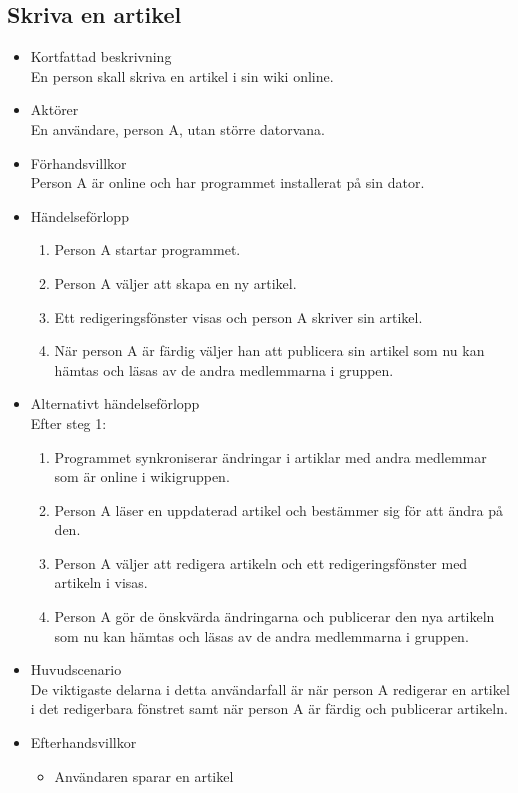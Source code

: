 \subsection{Skriva en artikel}
\begin{itemize}
	\item Kortfattad beskrivning
	\\En person skall skriva en artikel i sin wiki online.
	\item Aktörer
	\\En användare, person A, utan större datorvana.
	\item Förhandsvillkor
	\\Person A är online och har programmet installerat på sin dator.
	\item Händelseförlopp
	\begin{enumerate}
		\item Person A startar programmet.
		\item Person A väljer att skapa en ny artikel.
		\item Ett redigeringsfönster visas och person A skriver sin artikel.
		\item När person A är färdig väljer han att publicera sin artikel som nu kan hämtas och läsas av de andra medlemmarna i gruppen.
	\end{enumerate}
	\item Alternativt händelseförlopp
	\\Efter steg 1:
	\begin{enumerate}	
		\item Programmet synkroniserar ändringar i artiklar med andra medlemmar som är online i wikigruppen.
		\item Person A läser en uppdaterad artikel och bestämmer sig för att ändra på den.
		\item Person A väljer att redigera artikeln och ett redigeringsfönster med artikeln i visas.
		\item Person A gör de önskvärda ändringarna	och publicerar den nya artikeln	som nu kan hämtas och läsas av de andra medlemmarna i gruppen.
	\end{enumerate}
	\item Huvudscenario
	\\De viktigaste delarna i detta användarfall är när person A redigerar en artikel i det redigerbara fönstret samt när person A är färdig och publicerar artikeln.
	\item Efterhandsvillkor
	\begin{itemize}
		\item Användaren sparar en artikel

\end{itemize}
\end{itemize}
